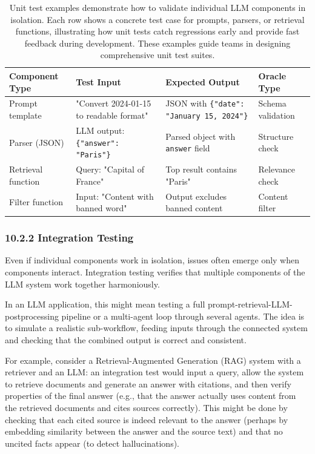 \begin{table}[t]
\centering
\caption{Unit test examples demonstrate how to validate individual LLM components in isolation. Each row shows a concrete test case for prompts, parsers, or retrieval functions, illustrating how unit tests catch regressions early and provide fast feedback during development. These examples guide teams in designing comprehensive unit test suites.}
\label{tab:ch10_unit_test_examples}
\small
\setlength{\tabcolsep}{6pt}
\renewcommand{\arraystretch}{1.3}
\begin{tabularx}{\linewidth}{@{}p{2.5cm}X X p{2.2cm}@{}}
\toprule
\rowcolor{gray!15}
\textbf{Component Type} & \textbf{Test Input} & \textbf{Expected Output} & \textbf{Oracle Type} \\
\midrule
Prompt template &
"Convert 2024-01-15 to readable format" &
JSON with \texttt{\{"date": "January 15, 2024"\}} &
Schema validation \\
\midrule
Parser (JSON) &
LLM output: \texttt{\{"answer": "Paris"\}} &
Parsed object with \texttt{answer} field &
Structure check \\
\midrule
Retrieval function &
Query: "Capital of France" &
Top result contains "Paris" &
Relevance check \\
\midrule
Filter function &
Input: "Content with banned word" &
Output excludes banned content &
Content filter \\
\bottomrule
\end{tabularx}
\end{table}

\subsubsection*{10.2.2 Integration Testing}
Even if individual components work in isolation, issues often emerge only when components interact. Integration testing verifies that multiple components of the LLM system work together harmoniously.  

In an LLM application, this might mean testing a full prompt-retrieval-LLM-postprocessing pipeline or a multi-agent loop through several agents. The idea is to simulate a realistic sub-workflow, feeding inputs through the connected system and checking that the combined output is correct and consistent.  

For example, consider a Retrieval-Augmented Generation (RAG) system with a retriever and an LLM: an integration test would input a query, allow the system to retrieve documents and generate an answer with citations, and then verify properties of the final answer (e.g., that the answer actually uses content from the retrieved documents and cites sources correctly). This might be done by checking that each cited source is indeed relevant to the answer (perhaps by embedding similarity between the answer and the source text) and that no uncited facts appear (to detect hallucinations).  


